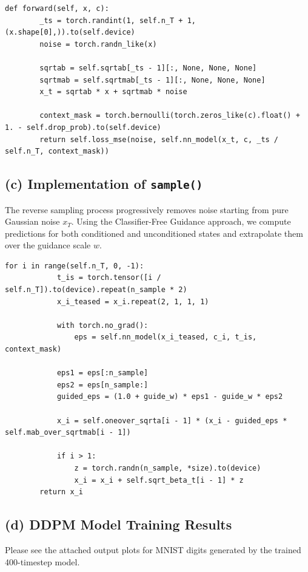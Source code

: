 \documentclass[11pt]{article}
\begin{document}
\begin{lstlisting}[caption={Implementation of \texttt{forward()}}]
    def forward(self, x, c):
        _ts = torch.randint(1, self.n_T + 1, (x.shape[0],)).to(self.device)
        noise = torch.randn_like(x)
        
        sqrtab = self.sqrtab[_ts - 1][:, None, None, None]
        sqrtmab = self.sqrtmab[_ts - 1][:, None, None, None]
        x_t = sqrtab * x + sqrtmab * noise
        
        context_mask = torch.bernoulli(torch.zeros_like(c).float() + 1. - self.drop_prob).to(self.device)
        return self.loss_mse(noise, self.nn_model(x_t, c, _ts / self.n_T, context_mask))
\end{lstlisting}


\subsection*{(c) Implementation of \texttt{sample()}}
The reverse sampling process progressively removes noise starting from pure Gaussian noise $x_T$. Using the Classifier-Free Guidance approach, we compute predictions for both conditioned and unconditioned states and extrapolate them over the guidance scale $w$.

\begin{lstlisting}[caption={Implementation of \texttt{sample()}}]
        for i in range(self.n_T, 0, -1):
            t_is = torch.tensor([i / self.n_T]).to(device).repeat(n_sample * 2)
            x_i_teased = x_i.repeat(2, 1, 1, 1)

            with torch.no_grad():
                eps = self.nn_model(x_i_teased, c_i, t_is, context_mask)

            eps1 = eps[:n_sample]
            eps2 = eps[n_sample:]
            guided_eps = (1.0 + guide_w) * eps1 - guide_w * eps2

            x_i = self.oneover_sqrta[i - 1] * (x_i - guided_eps * self.mab_over_sqrtmab[i - 1])

            if i > 1:
                z = torch.randn(n_sample, *size).to(device)
                x_i = x_i + self.sqrt_beta_t[i - 1] * z
        return x_i
\end{lstlisting}

\subsection*{(d) DDPM Model Training Results}
Please see the attached output plots for MNIST digits generated by the trained 400-timestep model.
\end{document}
